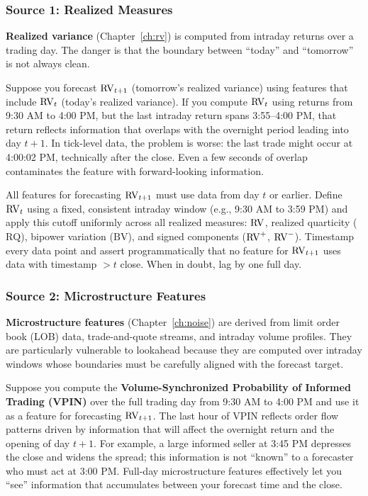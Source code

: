 \subsubsection{Source 1: Realized Measures}

\textbf{Realized variance} (Chapter~\ref{ch:rv}) is computed from intraday returns over a trading day.
The danger is that the boundary between ``today'' and ``tomorrow'' is not always clean.

\begin{warning}
Suppose you forecast $\operatorname{RV}_{t+1}$ (tomorrow's realized variance) using features that include $\operatorname{RV}_t$ (today's realized variance).
If you compute $\operatorname{RV}_t$ using returns from 9:30 AM to 4:00 PM, but the last intraday return spans 3:55--4:00 PM, that return reflects information that overlaps with the overnight period leading into day $t+1$.
In tick-level data, the problem is worse: the last trade might occur at 4:00:02 PM, technically after the close.
Even a few seconds of overlap contaminates the feature with forward-looking information.
\end{warning}

\begin{keyidea}
All features for forecasting $\operatorname{RV}_{t+1}$ must use data from day $t$ or earlier.
Define $\operatorname{RV}_t$ using a fixed, consistent intraday window (e.g., 9:30 AM to 3:59 PM) and apply this cutoff uniformly across all realized measures: $\operatorname{RV}$, realized quarticity ($\text{RQ}$), bipower variation ($\text{BV}$), and signed components ($\operatorname{RV}^+$, $\operatorname{RV}^-$).
Timestamp every data point and assert programmatically that no feature for $\operatorname{RV}_{t+1}$ uses data with timestamp $> t$ close.
When in doubt, lag by one full day.
\end{keyidea}


\subsubsection{Source 2: Microstructure Features}

\textbf{Microstructure features} (Chapter~\ref{ch:noise}) are derived from limit order book (LOB) data, trade-and-quote streams, and intraday volume profiles.
They are particularly vulnerable to lookahead because they are computed over intraday windows whose boundaries must be carefully aligned with the forecast target.

\begin{warning}
Suppose you compute the \textbf{Volume-Synchronized Probability of Informed Trading (VPIN)} over the full trading day from 9:30 AM to 4:00 PM and use it as a feature for forecasting $\operatorname{RV}_{t+1}$.
The last hour of VPIN reflects order flow patterns driven by information that will affect the overnight return and the opening of day $t+1$.
For example, a large informed seller at 3:45 PM depresses the close and widens the spread; this information is not ``known'' to a forecaster who must act at 3:00 PM.
Full-day microstructure features effectively let you ``see'' information that accumulates between your forecast time and the close.
\end{warning}

